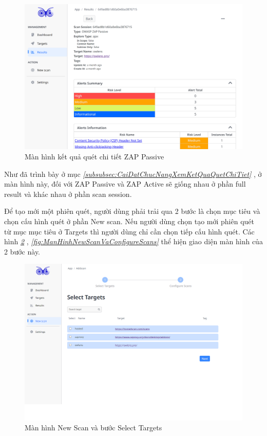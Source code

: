\begin{figure}[H]
      \centering
      \includegraphics[width=\textwidth]{applied-thesis-chapters/chapter-6/Màn hình kết quả quét chi tiết ZAP Passive.png}
      \caption{Màn hình kết quả quét chi tiết ZAP Passive}
      \label{fig:ManHinhKetQuaQuetChiTietPassive}
\end{figure}

Như đã trình bày ở mục \textit{\ref{subsubsec:CaiDatChucNangXemKetQuaQuetChiTiet} }
, ở màn hình này, đối với ZAP Passive và ZAP Active sẽ giống nhau ở phần full result và khác nhau ở phần scan session.

\tab \tab Để tạo mới một phiên quét, người dùng phải trải qua 2 bước là chọn mục tiêu và chọn cấu hình quét ở phần New scan.
Nếu người dùng chọn tạo mới phiên quét từ mục mục tiêu ở Targets thì người dùng chỉ cần chọn tiếp cấu hình quét.
Các hình \textit{\ref{fig:ManHinhNewScanVaSelectTargets} } 
, \textit{\ref{fig:ManHinhNewScanVaConfigureScans} } 
thể hiện giao diện màn hình của 2 bước này.

\begin{figure}[H]
      \centering
      \includegraphics[width=\textwidth]{applied-thesis-chapters/chapter-6/Màn hình New Scan và bước Select Targets.png}
      \caption{Màn hình New Scan và bước Select Targets}
      \label{fig:ManHinhNewScanVaSelectTargets}
\end{figure}

